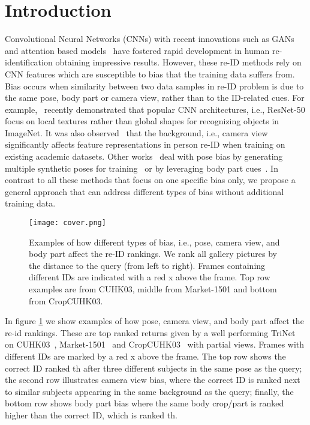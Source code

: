 \documentclass[10pt,twocolumn,letterpaper]{article}
\begin{document}
\section{Introduction}
Convolutional Neural Networks (CNNs) with recent innovations such as GANs~\cite{liu2018pose,wei2018person,deng2018image,zhong2017camera} and attention based models~\cite{li2018harmonious,xuattention,sidual} have fostered rapid development in human re-identification obtaining impressive results. 
However, these re-ID methods rely on CNN features which are susceptible to bias that the training data suffers from. Bias occurs when similarity between two data samples in re-ID problem is due to the same pose, body part or camera view, rather than to the ID-related cues.
For example,~\cite{geirhos2018imagenet} recently demonstrated that popular CNN architectures, i.e., ResNet-50 focus on local textures rather than global shapes for recognizing objects in ImageNet. It was also observed~\cite{song2018mask} that the background, i.e., camera view significantly affects feature representations in person re-ID when training on existing academic datasets. Other works~\cite{liu2018pose,su2017pose} deal with pose bias by generating multiple synthetic poses for training~\cite{liu2018pose} or by leveraging body part cues~\cite{su2017pose}. In contrast to all these methods that focus on one specific bias only, we propose a general approach that can address different types of bias without additional training data. \begin{figure}[h]
\texttt{[image: cover.png]}
   \caption{Examples of how different types of bias, i.e., pose, camera view, and body part affect the re-ID rankings.  We rank all gallery pictures by the distance to the query (from left to right). Frames containing different IDs are indicated with a red {x} above the frame. { Top row examples are from CUHK03, middle from Market-1501 and  bottom from CropCUHK03.}}
\label{fig:short}
\end{figure}
In figure \ref{fig:short} we show examples of how pose, camera view, and body part affect the re-id rankings. These  are top ranked returns given by a well performing TriNet~\cite{hermans2017defense} on   CUHK03~\cite{li2014deepreid}, Market-1501~\cite{zheng2015scalable} and CropCUHK03~\cite{iodice2018partial} with partial views. 
Frames with different IDs are marked by a red {x} above the frame. The top row shows  the correct ID  ranked th after three different subjects in the same pose as the query; the second row illustrates camera view bias, where the correct ID is ranked next to similar subjects appearing in the same background as the query; finally,  the bottom row shows body part bias where the same body crop/part is ranked higher than the correct ID, which is ranked th. 
\end{document}

